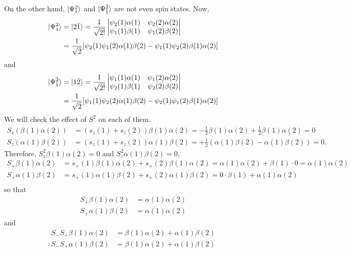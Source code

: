 On the other hand, $\ket{\Psi_1^2}$ and $\ket{\Psi_{\bar{1}}^{\bar{2}}}$ are not
even spin states. Now,
\[
\begin{aligned}
\ket{\Psi_1^2} &= \ket{2\bar{1}} = \frac{1}{\sqrt{2!}}\begin{vmatrix}
\psi_2(1)\alpha(1) & \psi_2(2)\alpha(2) \\
\psi_1(1)\beta(1) & \psi_1(2)\beta(2)\end{vmatrix} \\
 &= \frac{1}{\sqrt{2}}[\psi_2(1)\psi_1(2)\alpha(1)\beta(2) -
 \psi_1(1)\psi_2(2)\beta(1)\alpha(2)] 
\end{aligned}
\]
and
\[
\begin{aligned}
\ket{\Psi_{\bar{1}}^{\bar{2}}} &= \ket{1\bar{2}} =
\frac{1}{\sqrt{2!}}\begin{vmatrix} \psi_1(1)\alpha(1) & \psi_1(2)\alpha(2) \\
\psi_2(1)\beta(1) & \psi_2(2)\beta(2)\end{vmatrix} \\
 &= \frac{1}{\sqrt{2}}[\psi_1(1)\psi_2(2)\alpha(1)\beta(2) -
 \psi_2(1)\psi_1(2)\beta(1)\alpha(2)]
\end{aligned}
\]
We will check the effect of $S^2$ on each of them.
\[
\begin{aligned}
S_z(\beta(1)\alpha(2)) &= (s_z(1) + s_z(2))\beta(1)\alpha(2) =
-\frac{1}{2}\beta(1)\alpha(2) + \frac{1}{2}\beta(1)\alpha(2) = 0 \\
S_z(\alpha(1)\beta(2)) &= (s_z(1) + s_z(2))\alpha(1)\beta(2) = 
+\frac{1}{2}(\alpha(1)\beta(2) - \alpha(1)\beta(2)) = 0.
\end{aligned}
\]
Therefore, $S_z^2\beta(1)\alpha(2) = 0$ and $S_z^2\alpha(1)\beta(2) = 0$.
\[
\begin{aligned}
S_+\beta(1)\alpha(2) &= s_+(1)\beta(1)\alpha(2) + s_+(2)\beta(1)\alpha(2) = 
\alpha(1)\alpha(2) + \beta(1)\cdot 0 = \alpha(1)\alpha(2) \\
S_+\alpha(1)\beta(2) &= s_+(1)\alpha(1)\beta(2) + s_+(2)\alpha(1)\beta(2) =
0\cdot\beta(1) + \alpha(1)\alpha(2) \\
\end{aligned}
\]
so that 
\begin{equation}\label{c2e166}
\begin{aligned}
S_+\beta(1)\alpha(2) &= \alpha(1)\alpha(2) \\
S_+\alpha(1)\beta(2) &= \alpha(1)\alpha(2)
\end{aligned}
\end{equation}
and 
\begin{equation}\label{c2e167}
\begin{aligned}
S_-S_+\beta(1)\alpha(2) &= \beta(1)\alpha(2) + \alpha(1)\beta(2)\\
S_-S_+\alpha(1)\beta(2) &= \beta(1)\alpha(2) + \alpha(1)\beta(2)
\end{aligned}
\end{equation}
